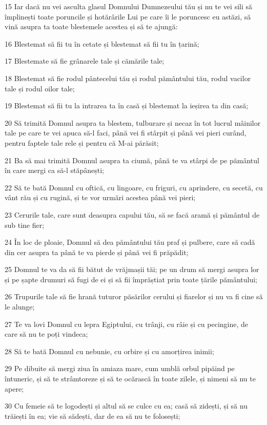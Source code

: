 \par 15 Iar dacă nu vei asculta glasul Domnului Dumnezeului tău și nu te vei sili să împlinești toate poruncile și hotărârile Lui pe care îi le poruncesc eu astăzi, să vină asupra ta toate blestemele acestea și să te ajungă:
\par 16 Blestemat să fii tu în cetate și blestemat să fii tu în țarină;
\par 17 Blestemate să fie grânarele tale și cămările tale;
\par 18 Blestemat să fie rodul pântecelui tău și rodul pământului tău, rodul vacilor tale și rodul oilor tale;
\par 19 Blestemat să fii tu la intrarea ta în casă și blestemat la ieșirea ta din casă;
\par 20 Să trimită Domnul asupra ta blestem, tulburare și necaz în tot lucrul mâinilor tale pe care te vei apuca să-l faci, până vei fi stârpit și până vei pieri curând, pentru faptele tale rele și pentru că M-ai părăsit;
\par 21 Ba să mai trimită Domnul asupra ta ciumă, până te va stârpi de pe pământul în care mergi ca să-l stăpânești;
\par 22 Să te bată Domnul cu oftică, cu lingoare, cu friguri, cu aprindere, cu secetă, cu vânt rău și cu rugină, și te vor urmări acestea până vei pieri;
\par 23 Cerurile tale, care sunt deasupra capului tău, să se facă aramă și pământul de sub tine fier;
\par 24 În loc de ploaie, Domnul să dea pământului tău praf și pulbere, care să cadă din cer asupra ta până te va pierde și până vei fi prăpădit;
\par 25 Domnul te va da să fii bătut de vrăjmașii tăi; pe un drum să mergi asupra lor și pe șapte drumuri să fugi de ei și să fii împrăștiat prin toate țările pământului;
\par 26 Trupurile tale să fie hrană tuturor păsărilor cerului și fiarelor și nu va fi cine să le alunge;
\par 27 Te va lovi Domnul cu lepra Egiptului, cu trânji, cu râie și cu pecingine, de care să nu te poți vindeca;
\par 28 Să te bată Domnul cu nebunie, cu orbire și cu amorțirea inimii;
\par 29 Pe dibuite să mergi ziua în amiaza mare, cum umblă orbul pipăind pe întuneric, și să te strâmtoreze și să te ocărască în toate zilele, și nimeni să nu te apere;
\par 30 Cu femeie să te logodești și altul să se culce cu ea; casă să zidești, și să nu trăiești în ea; vie să sădești, dar de ea să nu te folosești;
